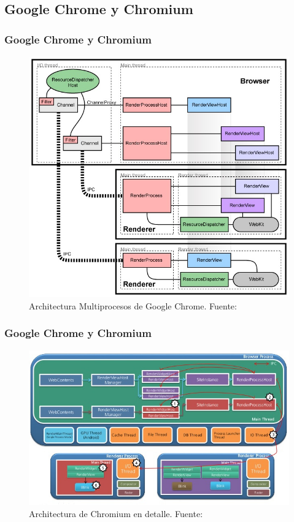 \documentclass[serif,9pt]{beamer}
\begin{document}
\subsection{Google Chrome y Chromium}
\begin{frame}
	\frametitle{Google Chrome y Chromium}
	\begin{figure}[h]
	    \centering
	    \includegraphics[scale=0.35]{figures/archGC.jpg}
	    \caption{Architectura Multiprocesos de Google Chrome. Fuente: \cite{multiProcGC}}
	    \label{fig:UsageShare}
	\end{figure}
\end{frame}

\begin{frame}
	\frametitle{Google Chrome y Chromium}
	\begin{figure}[h]
        \centering
        \includegraphics[scale=0.4]{figures/chromium-rendering-pipeline-28-638.jpg}
        \caption{Architectura de Chromium en detalle. Fuente: \cite{ChrRenderPipe}}
        \label{fig:archGC2}
    \end{figure}
\end{frame}
\end{document}
